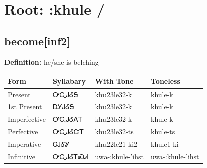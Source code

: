 \documentclass{article}%
\begin{document}
%
\normalsize%
\section*{Root: :khule / }%
\subsection*{become[inf2]}%
\textbf{Definition: }%
he/she is belching%
\\[0.5em]%
\begin{tabular}{|l|l|l|l|}%
\hline%
\textbf{Form}&\textbf{Syllabary}&\textbf{With Tone}&\textbf{Toneless}\\%
\hline%
Present&ᎤᏩᎫᎴᎦ&khu23le32{-}k&khule{-}k\\%
1st Present&ᎠᎩᎫᎴᎦ&khu23le32{-}k&khule{-}k\\%
Imperfective&ᎤᏩᎫᎴᎪᎢ&khu23le32{-}k&khule{-}k\\%
Perfective&ᎤᏩᎫᎴᏨᎢ&khu23le32{-}ts&khule{-}ts\\%
Imperative&ᏣᎫᎴᎩ&khu22le21{-}ki2&khule1{-}ki\\%
Infinitive&ᎤᏩᎫᎴᎢᏍᏗ&uwa{-}:khule{-}'ihst&uwa{-}:khule{-}'ihst\\%
\hline%
\end{tabular}%
\\[1em]%
\end{document}
